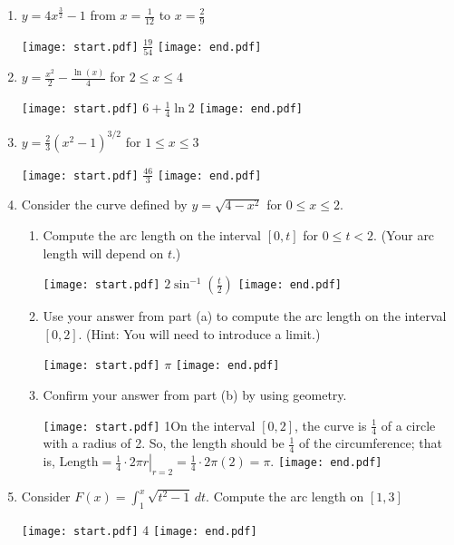 \documentclass[12pt]{article}
\begin{document}
\begin{enumerate}

\item $y=4x^{\frac{3}{2}}-1$ from $x=\frac{1}{12}$ to $x=\frac{2}{9}$ 

\texttt{[image: start.pdf]}
{{$\frac{19}{54}$}}
\texttt{[image: end.pdf]}


\item $y = \frac{x^2}{2} - \frac{\ln(x)}{4}$ for $2 \leq x \leq 4$ 

\texttt{[image: start.pdf]}
{{$6+\frac{1}{4}\ln{2}$}}
\texttt{[image: end.pdf]}


\item $y=\frac{2}{3}(x^2-1)^{3/2}$ for $1\leq x \leq 3$ 

\texttt{[image: start.pdf]}
{{$\frac{46}{3}$}}
\texttt{[image: end.pdf]}


\item Consider the curve defined by $y = \sqrt{4-x^2}$ for $0 \leq x \leq 2$.

\begin{enumerate}

\item Compute the arc length on the interval $[0,t]$ for $0 \leq t <2$. (Your arc length will depend on $t$.)

\texttt{[image: start.pdf]}
{{$2\sin^{-1}{\left(\frac{t}{2}\right)}$}}
\texttt{[image: end.pdf]}


\item Use your answer from part (a) to compute the arc length on the interval $[0,2]$. (Hint: You will need to introduce a limit.)

\texttt{[image: start.pdf]}
{{$\pi$}}
\texttt{[image: end.pdf]}


\item Confirm your answer from part (b) by using geometry.

\texttt{[image: start.pdf]}
{{{1\linewidth}{On the interval $[0,2]$, the curve is $\frac{1}{4}$ of a circle with a radius of 2.  So, the length should be $\frac{1}{4}$  of the circumference; that is, $\text{Length} = \left.\frac{1}{4} \cdot 2 \pi r \right|_{r=2}= \frac{1}{4} \cdot 2 \pi (2) = \pi$.}}}
\texttt{[image: end.pdf]}


\end{enumerate}

\item Consider $F(x)=\int_1^x \sqrt{t^2-1} \,dt$.  Compute the arc length on $[1,3]$

\texttt{[image: start.pdf]}
{{4}}
\texttt{[image: end.pdf]}



\end{enumerate}
\end{document}
